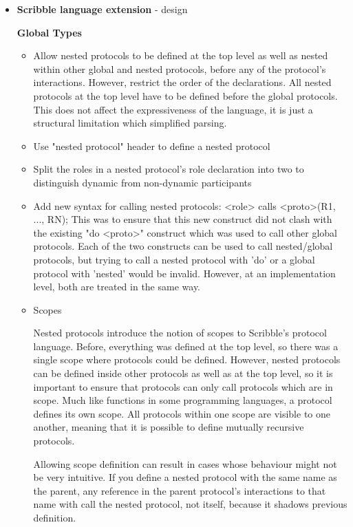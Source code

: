 \documentclass[12pt,twoside]{report}
\begin{document}
\begin{itemize}
    \item \textbf{Scribble language extension} - design
    
    \textbf{Global Types}
    \begin{itemize}
        \item Allow nested protocols to be defined at the top level as well as nested within other global and nested protocols, before any of the protocol's interactions. However, restrict the order of the declarations. All nested protocols at the top level have to be defined before the global protocols. This does not affect the expressiveness of the language, it is just a structural limitation which simplified parsing. 
        \item Use "nested protocol" header to define a nested protocol
        \item Split the roles in a nested protocol's role declaration into two to distinguish dynamic from non-dynamic participants 
        \item Add new syntax for calling nested protocols: <role> calls <proto>(R1, ..., RN);
        This was to ensure that this new construct did not clash with the existing "do <proto>" construct which was used to call other global protocols. Each of the two constructs can be used to call nested/global protocols, but trying to call a nested protocol with 'do' or a global protocol with 'nested' would be invalid. However, at an implementation level, both are treated in the same way.
        \item Scopes
        
        Nested protocols introduce the notion of scopes to Scribble's protocol language. Before, everything was defined at the top level, so there was a single scope where protocols could be defined. However, nested protocols can be defined inside other protocols as well as at the top level, so it is important to ensure that protocols can only call protocols which are in scope. Much like functions in some programming languages, a protocol defines its own scope. All protocols within one scope are visible to one another, meaning that it is possible to define mutually recursive protocols. 
        
        Allowing scope definition can result in cases whose behaviour might not be very intuitive. If you define a nested protocol with the same name as the parent, any reference in the parent protocol's interactions to that name with call the nested protocol, not itself, because it shadows previous definition.
        

\end{itemize}
\end{itemize}
\end{document}
